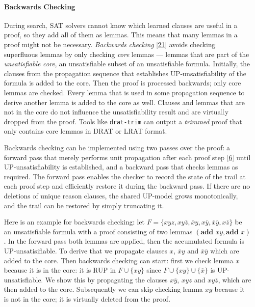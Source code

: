 \documentclass[
]{report}
\begin{document}
\paragraph{Backwards Checking}

During search, SAT solvers cannot know which learned clauses are useful
in a proof, so they add all of them as lemmas. This means that many
lemmas in a proof might not be necessary. \emph{Backwards checking}
{[}\protect\hyperlink{ref-DBLP:confux2ffmcadux2fHeuleHW13}{21}{]} avoids
checking superfluous lemmas by only checking \emph{core} lemmas ---
lemmas that are part of the \emph{unsatisfiable core}, an unsatisfiable
subset of an unsatisfiable formula. Initially, the clauses from the
propagation sequence that establishes UP-unsatisfiability of the formula
is added to the core. Then the proof is processed backwards; only core
lemmas are checked. Every lemma that is used in some propagation
sequence to derive another lemma is added to the core as well. Clauses
and lemmas that are not in the core do not influence the
unsatisfiability result and are virtually dropped from the proof. Tools
like \texttt{drat-trim} can output a \emph{trimmed} proof that only
contains core lemmas in DRAT or LRAT format.

Backwards checking can be implemented using two passes over the proof: a
forward pass that merely performs unit propagation after each proof step
{[}\protect\hyperlink{ref-DBLP:confux2ffmcadux2fRebola-PardoC18}{6}{]}
until UP-unsatisfiability is established, and a backward pass that
checks lemmas as required. The forward pass enables the checker to
record the state of the trail at each proof step and efficiently restore
it during the backward pass. If there are no deletions of unique reason
clauses, the shared UP-model grows monotonically, and the trail can be
restored by simply truncating it.

Here is an example for backwards checking: let
\(F = \{xyz, xy\overline{z}, \overline{x}y, x\overline{y}, \overline{x}\overline{y}, x\overline{z}\}\)
be an unsatisfiable formula with a proof consisting of two lemmas
\((\textbf{add } xy, \textbf{add } x)\). In the forward pass both lemmas
are applied, then the accumulated formula is UP-unsatisifiable. To
derive that we propagate clauses \(x\), \(\overline{x}y\) and
\(\overline{x}\overline{y}\) which are added to the core. Then backwards
checking can start: first we check lemma \(x\) because it is in the
core: it is RUP in \(F \cup \{xy\}\) since
\(F \cup \{xy\} \cup \{\overline{x}\}\) is UP-unsatisfiable. We show
this by propagating the clauses \(x\overline{y}\), \(xyz\) and
\(xy\overline{z}\), which are then added to the core. Subsequently we
can skip checking lemma \(xy\) because it is not in the core; it is
virtually deleted from the proof.
\end{document}
